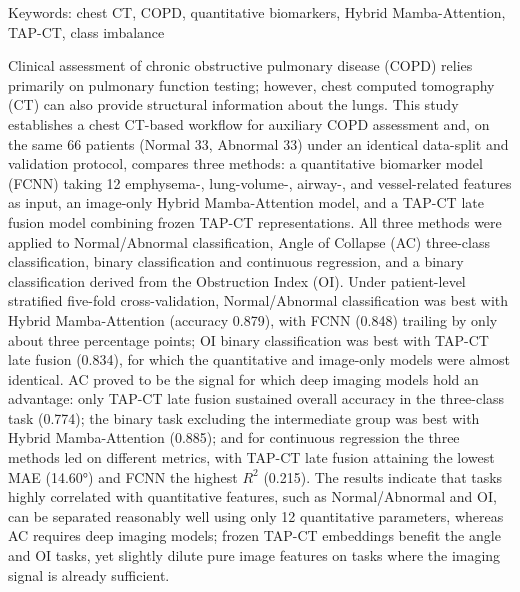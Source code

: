 \begin{EnAbstract}
    \begin{EnAbstractItems}
        \noindent \text Keywords: chest CT, COPD, quantitative biomarkers, Hybrid Mamba-Attention, TAP-CT, class imbalance

    \end{EnAbstractItems}

    \begin{EnAbstractDescription}
        Clinical assessment of chronic obstructive pulmonary disease (COPD) relies primarily on pulmonary function testing; however, chest computed tomography (CT) can also provide structural information about the lungs. This study establishes a chest CT-based workflow for auxiliary COPD assessment and, on the same 66 patients (Normal 33, Abnormal 33) under an identical data-split and validation protocol, compares three methods: a quantitative biomarker model (FCNN) taking 12 emphysema-, lung-volume-, airway-, and vessel-related features as input, an image-only Hybrid Mamba-Attention model, and a TAP-CT late fusion model combining frozen TAP-CT representations. All three methods were applied to Normal/Abnormal classification, Angle of Collapse (AC) three-class classification, binary classification and continuous regression, and a binary classification derived from the Obstruction Index (OI). Under patient-level stratified five-fold cross-validation, Normal/Abnormal classification was best with Hybrid Mamba-Attention (accuracy 0.879), with FCNN (0.848) trailing by only about three percentage points; OI binary classification was best with TAP-CT late fusion (0.834), for which the quantitative and image-only models were almost identical. AC proved to be the signal for which deep imaging models hold an advantage: only TAP-CT late fusion sustained overall accuracy in the three-class task (0.774); the binary task excluding the intermediate group was best with Hybrid Mamba-Attention (0.885); and for continuous regression the three methods led on different metrics, with TAP-CT late fusion attaining the lowest MAE (14.60°) and FCNN the highest \(R^2\) (0.215). The results indicate that tasks highly correlated with quantitative features, such as Normal/Abnormal and OI, can be separated reasonably well using only 12 quantitative parameters, whereas AC requires deep imaging models; frozen TAP-CT embeddings benefit the angle and OI tasks, yet slightly dilute pure image features on tasks where the imaging signal is already sufficient.
    \end{EnAbstractDescription}
    
\end{EnAbstract}

